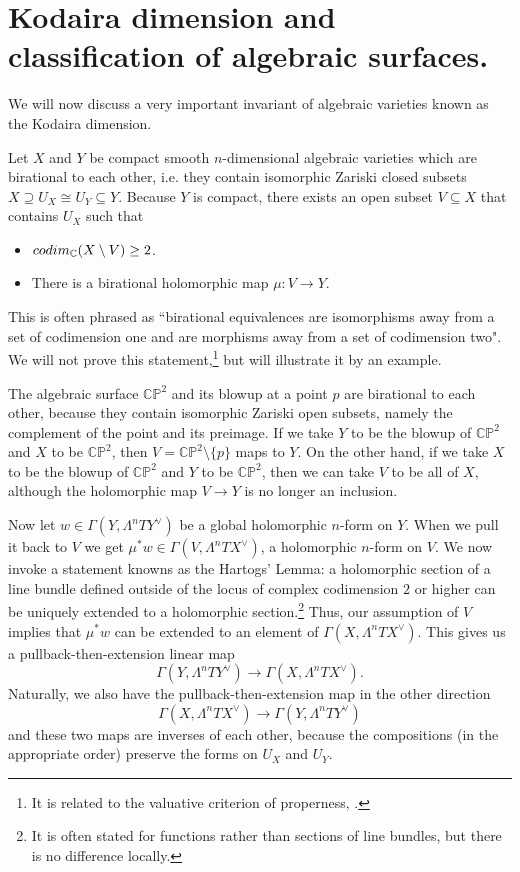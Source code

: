\documentclass[11pt]{article}
\numberwithin{equation}{section}
\numberwithin{footnote}{section}
\newcommand{\blue}{\color{blue}}
\renewcommand{\P}{{\mathbb P}}
\newcommand{\C}{{\mathbb C}}
\begin{document}
\section{Kodaira dimension and classification of algebraic surfaces.}
We will now discuss a very important invariant of algebraic varieties known as the {\blue Kodaira dimension}.

\smallskip
Let $X$ and $Y$ be compact smooth $n$-dimensional algebraic varieties which are birational to each other, i.e. they contain isomorphic Zariski closed subsets $X\supseteq U_X\cong U_Y\subseteq Y$. Because $Y$ is compact, there exists an open subset $V\subseteq X$ that contains $U_X$ such that
\begin{itemize}
\item  ${\rm codim}_\C(X\setminus V) \geq 2$.

\item There is a birational holomorphic map $\mu:V\to Y$. 
\end{itemize}
This is often phrased as ``birational equivalences are isomorphisms  away from a set of codimension one and are morphisms away from a set of codimension two". We will not prove this statement,\footnote{ It is related to the valuative criterion of properness, \cite{Hartshorne}.} but will illustrate it by an example.

\smallskip
The algebraic surface $\C\P^2$ and its blowup at a point $p$ are birational to each other, because they contain isomorphic Zariski open subsets, namely the complement of the point and its preimage.
If we take $Y$ to be the blowup of $\C\P^2$ and $X$ to be $\C\P^2$, then $V= \C\P^2\setminus\{p\}$ maps to $Y$. On the other hand, if we take $X$ to be the blowup of $\C\P^2$ and $Y$ to be $\C\P^2$, then we can take $V$ to be all of $X$,
although the holomorphic map $V\to Y$ is no longer an inclusion. 

\smallskip
Now let $w\in \Gamma(Y,\Lambda^n TY^{\vee})$ be a global holomorphic $n$-form on $Y$. When we pull it back to $V$ we get
$\mu^* w \in  \Gamma(V,\Lambda^n TX^{\vee})$, a holomorphic $n$-form on $V$. We now invoke a statement knowns as the Hartogs' Lemma: a holomorphic section of a line bundle defined outside of the locus of complex codimension $2$ or higher can be uniquely extended to a holomorphic section.\footnote{ It is often stated for functions rather than sections of line bundles, but there is no difference locally.} Thus, our assumption of $V$ implies that $\mu^*w$ can be extended to an element of $\Gamma(X,\Lambda^n TX^{\vee})$. This gives us a pullback-then-extension linear map 
$$
\Gamma(Y,\Lambda^n TY^{\vee})\to \Gamma(X,\Lambda^n TX^{\vee}).
$$
Naturally, we also have the pullback-then-extension map in the other direction
$$
\Gamma(X,\Lambda^n TX^{\vee})\to \Gamma(Y,\Lambda^n TY^{\vee})
$$
and these two maps are inverses of each other, because the compositions (in the appropriate order) preserve the forms on $U_X$ and $U_Y$.
\end{document}
